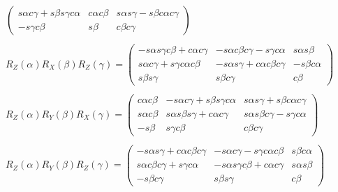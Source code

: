 \documentclass[10pt, letterpaper]{report}
\begin{document}
\begin{eqnarray*}
\begin{pmatrix}
 s \alpha c \gamma +  s \beta s \gamma c \alpha &  c \alpha c \beta &  s \alpha s \gamma -  s \beta c \alpha c \gamma \\ 
- s \gamma c \beta &  s \beta &  c \beta c \gamma 
\end{pmatrix} \\ \\ 
R_{Z}(\alpha)R_{X}(\beta)R_{Z}(\gamma)=\begin{pmatrix}
- s \alpha s \gamma c \beta +  c \alpha c \gamma & - s \alpha c \beta c \gamma -  s \gamma c \alpha &  s \alpha s \beta \\ 
 s \alpha c \gamma +  s \gamma c \alpha c \beta & - s \alpha s \gamma +  c \alpha c \beta c \gamma & - s \beta c \alpha \\ 
 s \beta s \gamma &  s \beta c \gamma &  c \beta 
\end{pmatrix} \\ \\ 
R_{Z}(\alpha)R_{Y}(\beta)R_{X}(\gamma)=\begin{pmatrix}
 c \alpha c \beta & - s \alpha c \gamma +  s \beta s \gamma c \alpha &  s \alpha s \gamma +  s \beta c \alpha c \gamma \\ 
 s \alpha c \beta &  s \alpha s \beta s \gamma +  c \alpha c \gamma &  s \alpha s \beta c \gamma -  s \gamma c \alpha \\ 
- s \beta &  s \gamma c \beta &  c \beta c \gamma 
\end{pmatrix} \\ \\ 
R_{Z}(\alpha)R_{Y}(\beta)R_{Z}(\gamma)=\begin{pmatrix}
- s \alpha s \gamma +  c \alpha c \beta c \gamma & - s \alpha c \gamma -  s \gamma c \alpha c \beta &  s \beta c \alpha \\ 
 s \alpha c \beta c \gamma +  s \gamma c \alpha & - s \alpha s \gamma c \beta +  c \alpha c \gamma &  s \alpha s \beta \\ 
- s \beta c \gamma &  s \beta s \gamma &  c \beta 
\end{pmatrix} 
\end{eqnarray*} 
\end{document}
